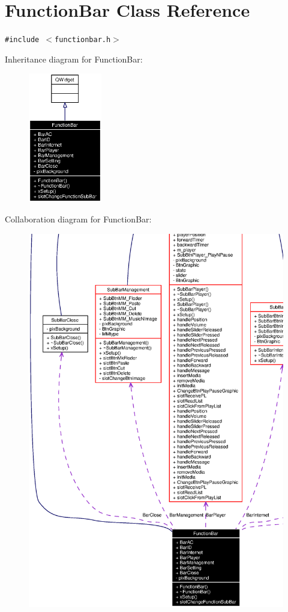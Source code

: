 \section{Function\-Bar Class Reference}
\label{classFunctionBar}
{\tt \#include $<$functionbar.h$>$}

Inheritance diagram for Function\-Bar:\begin{figure}[H]
\begin{center}
\leavevmode
\includegraphics[width=91pt]{classFunctionBar__inherit__graph}
\end{center}
\end{figure}
Collaboration diagram for Function\-Bar:\begin{figure}[H]
\begin{center}
\leavevmode
\includegraphics[width=420pt]{classFunctionBar__coll__graph}
\end{center}
\end{figure}



